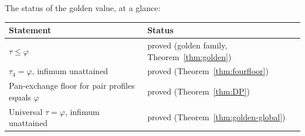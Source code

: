 \documentclass[11pt]{article}
\theoremstyle{definition}
\begin{document}
The status of the golden value, at a glance:
\begin{center}
\begin{tabular}{ll}
\hline
Statement & Status \\
\hline
$\tau\le\varphi$ & proved (golden family, Theorem~\ref{thm:golden}) \\
$\tau_4=\varphi$, infimum unattained & proved
(Theorem~\ref{thm:fourfloor}) \\
Pan-exchange floor for pair profiles equals $\varphi$ & proved
(Theorem~\ref{thm:DP}) \\
Universal $\tau=\varphi$, infimum unattained & proved
(Theorem~\ref{thm:golden-global}) \\
\hline
\end{tabular}
\end{center}
\end{document}
